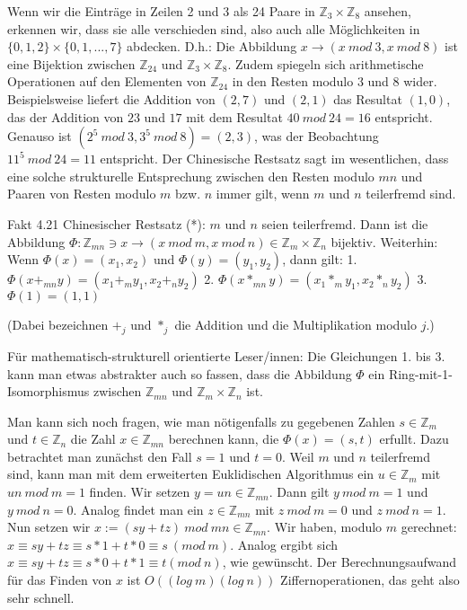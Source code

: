 \documentclass[a4paper]{article}
\begin{document}
\begin{multicols}{3}
    Wenn wir die Einträge in Zeilen 2 und 3 als 24 Paare in $\mathbb{Z}_3 \times\mathbb{Z}_8$ ansehen, erkennen wir, dass sie alle verschieden sind, also auch alle Möglichkeiten in $\{0,1,2\}\times\{0,1,...,7\}$ abdecken. D.h.: Die Abbildung $x\rightarrow (x\ mod\ 3,x\ mod\ 8)$ ist eine Bijektion zwischen $\mathbb{Z}_{24}$ und $\mathbb{Z}_3\times\mathbb{Z}_8$. Zudem spiegeln sich arithmetische Operationen auf den Elementen von $\mathbb{Z}_{24}$ in den Resten modulo $3$ und $8$ wider. Beispielsweise liefert die Addition von $(2,7)$ und $(2,1)$ das Resultat $(1,0)$, das der Addition von $23$ und $17$ mit dem Resultat $40\ mod\ 24 = 16$ entspricht. Genauso ist $(2^5\ mod\ 3, 3^5\ mod\ 8)=(2,3)$, was der Beobachtung $11^5\ mod\ 24 = 11$ entspricht.
    Der Chinesische Restsatz sagt im wesentlichen, dass eine solche strukturelle Entsprechung zwischen den Resten modulo $mn$ und Paaren von Resten modulo $m$ bzw. $n$ immer gilt, wenn $m$ und $n$ teilerfremd sind.

    Fakt 4.21 Chinesischer Restsatz (*): $m$ und $n$ seien teilerfremd. Dann ist die Abbildung $\Phi:\mathbb{Z}_{mn} \owns x \rightarrow (x\ mod\ m, x\ mod\ n)\in\mathbb{Z}_m\times\mathbb{Z}_n$ bijektiv. Weiterhin: Wenn $\Phi(x)=(x_1,x_2)$ und $\Phi(y)=(y_1,y_2)$, dann gilt:
    1. $\Phi(x+_{mn} y) = (x_1 +_m y_1 , x_2 +_n y_2)$
    2. $\Phi(x*_{mn} y) = (x_1 *_m y_1 , x_2 *_n y_2)$
    3. $\Phi(1) = (1,1)$

    (Dabei bezeichnen $+_j$ und $*_j$ die Addition und die Multiplikation modulo $j$.)

    Für mathematisch-strukturell orientierte Leser/innen: Die Gleichungen 1. bis 3. kann man etwas abstrakter auch so fassen, dass die Abbildung $\Phi$ ein Ring-mit-1-Isomorphismus zwischen $\mathbb{Z}_{mn}$ und $\mathbb{Z}_m \times\mathbb{Z}_n$ ist.

    Man kann sich noch fragen, wie man nötigenfalls zu gegebenen Zahlen $s\in\mathbb{Z}_m$ und $t\in\mathbb{Z}_n$ die Zahl $x\in\mathbb{Z}_{mn}$ berechnen kann, die $\Phi(x)=(s,t)$ erfullt. Dazu betrachtet man zunächst den Fall $s=1$ und $t=0$. Weil $m$ und $n$ teilerfremd sind, kann man mit dem erweiterten Euklidischen Algorithmus ein $u\in\mathbb{Z}_{m}$ mit $un\ mod\ m=1$
    finden. Wir setzen $y=un\in\mathbb{Z}_{mn}$. Dann gilt $y\ mod\ m=1$ und $y\ mod\ n=0$. Analog findet man ein $z\in\mathbb{Z}_{mn}$ mit $z\ mod\ m=0$ und $z\ mod\ n=1$. Nun setzen wir $x:=(sy+tz)\ mod\ mn\in\mathbb{Z}_{mn}$. Wir haben, modulo $m$ gerechnet: $x\equiv sy+tz\equiv s*1+t* 0 \equiv s\ (mod\ m)$. Analog ergibt sich $x\equiv sy+tz\equiv s*0+t*1 \equiv t(mod\ n)$, wie gewünscht. Der Berechnungsaufwand für das Finden von $x$ ist $O((log\ m)(log\ n))$ Ziffernoperationen, das geht also sehr schnell.


\end{multicols}
\end{document}
